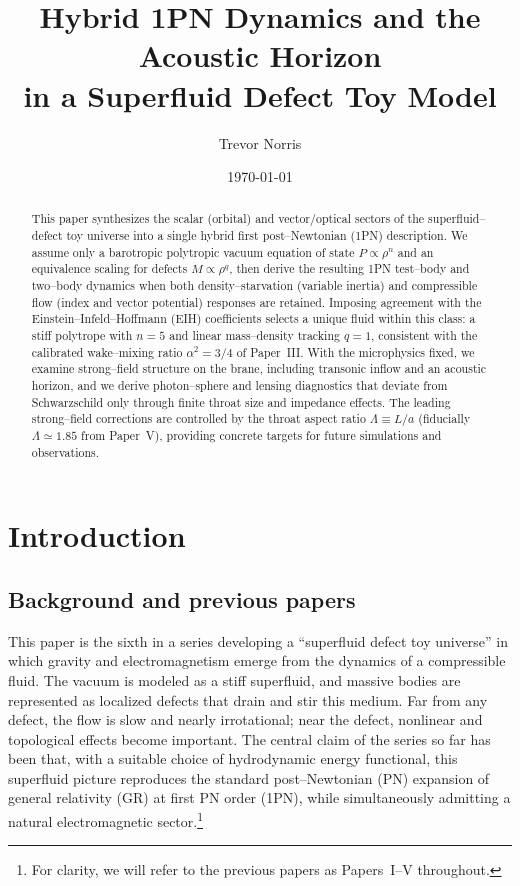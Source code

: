\documentclass[11pt]{article}
\title{Hybrid 1PN Dynamics and the Acoustic Horizon\\
in a Superfluid Defect Toy Model}
\author{Trevor Norris}
\date{\today}
\begin{document}
\maketitle

\begin{abstract}
This paper synthesizes the scalar (orbital) and vector/optical sectors of the
superfluid--defect toy universe into a single hybrid first post--Newtonian (1PN)
description.  We assume only a barotropic polytropic vacuum equation of state
\(P \propto \rho^n\) and an equivalence scaling for defects \(M \propto \rho^q\),
then derive the resulting 1PN test--body and two--body dynamics when both
density--starvation (variable inertia) and compressible flow (index and vector
potential) responses are retained.  Imposing agreement with the
Einstein--Infeld--Hoffmann (EIH) coefficients selects a unique fluid within
this class: a stiff polytrope with \(n=5\) and linear mass--density tracking
\(q=1\), consistent with the calibrated wake--mixing ratio
\(\alpha^2 = 3/4\) of Paper~III.  With the microphysics fixed, we examine
strong--field structure on the brane, including transonic inflow and an
acoustic horizon, and we derive photon--sphere and lensing diagnostics that
deviate from Schwarzschild only through finite throat size and impedance
effects.  The leading strong--field corrections are controlled by the throat
aspect ratio \(\Lambda \equiv L/a\) (fiducially \(\Lambda \simeq 1.85\) from
Paper~V), providing concrete targets for future simulations and observations.
\end{abstract}

\section{Introduction}
\label{sec:intro}

\subsection{Background and previous papers}
\label{subsec:intro-background}

This paper is the sixth in a series developing a ``superfluid defect toy
universe'' in which gravity and electromagnetism emerge from the dynamics
of a compressible fluid.  The vacuum is modeled as a stiff superfluid, and
massive bodies are represented as localized defects that drain and stir this
medium.  Far from any defect, the flow is slow and nearly irrotational; near
the defect, nonlinear and topological effects become important.  The central
claim of the series so far has been that, with a suitable choice of
hydrodynamic energy functional, this superfluid picture reproduces the
standard post--Newtonian (PN) expansion of general relativity (GR) at first
PN order (1PN), while simultaneously admitting a natural electromagnetic
sector.\footnote{For clarity, we will refer to the previous papers as
Papers~I--V\cite{Norris:Paper1,Norris:Paper2,Norris:Paper3,Norris:Paper4,Norris:Paper5}
throughout.}
\end{document}
